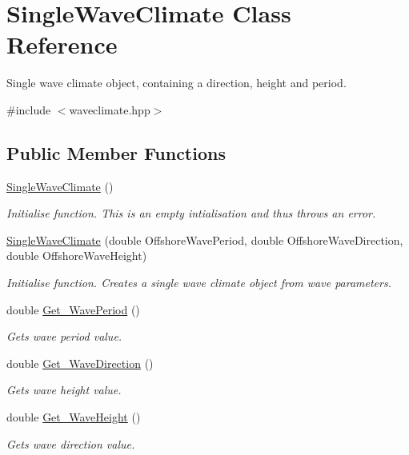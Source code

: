 \hypertarget{classSingleWaveClimate}{\section{Single\-Wave\-Climate Class Reference}
\label{classSingleWaveClimate}
}


Single wave climate object, containing a direction, height and period.  




{\ttfamily \#include $<$waveclimate.\-hpp$>$}

\subsection*{Public Member Functions}
\begin{DoxyCompactItemize}
\item 
\hyperlink{classSingleWaveClimate_abc7b219114f452e2350d56edf7f5a577}{Single\-Wave\-Climate} ()
\begin{DoxyCompactList}\small\item\em Initialise function. This is an empty intialisation and thus throws an error. \end{DoxyCompactList}\item 
\hyperlink{classSingleWaveClimate_a907f65795133c48d1a5d01bdc6093e93}{Single\-Wave\-Climate} (double Offshore\-Wave\-Period, double Offshore\-Wave\-Direction, double Offshore\-Wave\-Height)
\begin{DoxyCompactList}\small\item\em Initialise function. Creates a single wave climate object from wave parameters. \end{DoxyCompactList}\item 
double \hyperlink{classSingleWaveClimate_afa14dfdfbde2a6d859e4c655f2d847b5}{Get\-\_\-\-Wave\-Period} ()
\begin{DoxyCompactList}\small\item\em Gets wave period value. \end{DoxyCompactList}\item 
double \hyperlink{classSingleWaveClimate_adfbaa3f4505e753719d2ca91e035b6ad}{Get\-\_\-\-Wave\-Direction} ()
\begin{DoxyCompactList}\small\item\em Gets wave height value. \end{DoxyCompactList}\item 
double \hyperlink{classSingleWaveClimate_a84dd4eb959c3be73aee62200c4ee5cd2}{Get\-\_\-\-Wave\-Height} ()
\begin{DoxyCompactList}\small\item\em Gets wave direction value. \end{DoxyCompactList}\end{DoxyCompactItemize}


